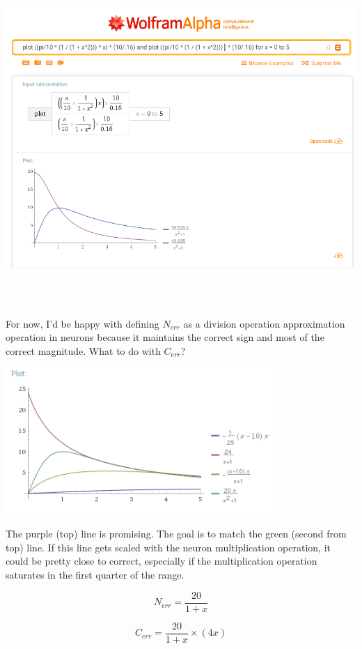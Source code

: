 \documentclass[12pt, letterpaper, oneside, notitlepage, onecolumn]{article}
\begin{document}
\includegraphics[height=5in, angle=0]{UnderstandingErrorCorrection}

For now, I'd be happy with defining $N_{err}$ as a division operation approximation operation in neurons because it maintains the correct sign and most of the correct magnitude. What to do with $C_{err}$?

\includegraphics[width=4in, angle=0]{CErr_Guess2}

The purple (top) line is promising. The goal is to match the green (second from top) line. If this line gets scaled with the neuron multiplication operation, it could be pretty close to correct, especially if the multiplication operation saturates in the first quarter of the range.

\begin{equation}
N_{err} = \dfrac{20}{1 + x}
\end{equation}

\begin{equation}
C_{err} = \dfrac{20}{1 + x} \times (4 x)
\end{equation}
\end{document}

